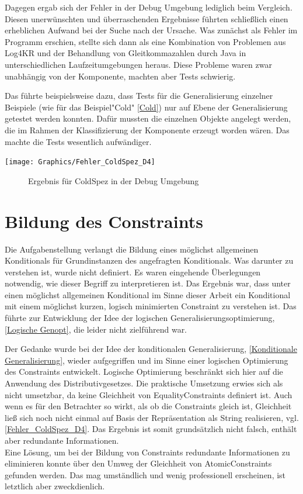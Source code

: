 \documentclass[draft]{scrreprt}
\begin{document}
{Dagegen ergab sich der Fehler in der Debug Umgebung lediglich beim Vergleich. Diesen unerwünschten und überraschenden Ergebnisse führten schließlich einen erheblichen Aufwand bei der Suche nach der Ursache. Was zunächst als Fehler im Programm erschien, stellte sich dann als eine Kombination von Problemen aus Log4KR und der Behandlung von Gleitkommazahlen durch Java in unterschiedlichen Laufzeitumgebungen heraus. Diese Probleme waren zwar unabhängig von der Komponente, machten aber Tests schwierig.


Das führte beispielsweise dazu, dass Tests für die Generalisierung einzelner Beispiele (wie für das Beispiel"{}Cold"{} \ref{Cold}) nur auf Ebene der Generalisierung getestet werden konnten. 
Dafür mussten die einzelnen Objekte angelegt werden, die im Rahmen der Klassifizierung der Komponente erzeugt worden wären. Das machte die Tests wesentlich aufwändiger. 


\texttt{[image: Graphics/Fehler\_ColdSpez\_D4]} \label{Fehler_ColdSpez_D4}
\begin{figure}[h]
	\caption{Ergebnis für ColdSpez in der Debug Umgebung}
	
\end{figure}



\section{Bildung des Constraints}
Die Aufgabenstellung verlangt die Bildung eines möglichst allgemeinen Konditionals für Grundinstanzen des angefragten Konditionals. Was darunter zu verstehen ist, wurde nicht definiert. Es waren eingehende Überlegungen notwendig, wie dieser Begriff zu interpretieren ist. Das Ergebnis war, dass unter einen möglichst allgemeinen Konditional im Sinne dieser Arbeit ein Konditional mit einem möglichst kurzen, logisch minimierten Constraint zu verstehen ist. Das führte zur Entwicklung der Idee der logischen Generalisierungsoptimierung, \ref{Logische Genopt}, die leider nicht zielführend war. 

Der Gedanke wurde bei der Idee der konditionalen Generalisierung, \ref{Konditionale Generalisierung}, wieder aufgegriffen und im Sinne einer logischen Optimierung des Constraints entwickelt. Logische Optimierung beschränkt sich hier auf die Anwendung des Distributivgesetzes. Die praktische Umsetzung erwies sich als nicht umsetzbar, da keine Gleichheit von EqualityConstraints definiert ist. Auch wenn es für den Betrachter so wirkt, als ob die Constraints gleich ist, Gleichheit ließ sich noch nicht einmal auf Basis der Repräsentation als String realisieren, vgl. \ref{Fehler_ColdSpez_D4}. Das Ergebnis ist somit grundsätzlich nicht falsch, enthält aber redundante Informationen.\\
Eine Lösung, um bei der Bildung von Constraints redundante Informationen zu eliminieren  konnte über den Umweg der Gleichheit von AtomicConstraints gefunden werden. Das mag umständlich und wenig professionell erscheinen, ist letztlich aber zweckdienlich. 

}
\end{document}
